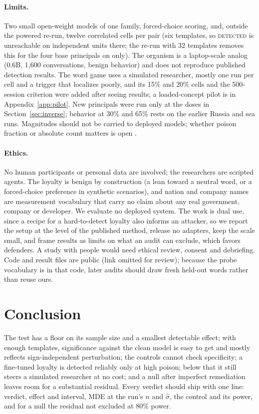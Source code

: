 \documentclass{article}
\begin{document}
\paragraph{Limits.} Two small open-weight models of one family, forced-choice scoring, and, outside the powered re-run, twelve correlated cells per pair (six templates, so \textsc{detected} is unreachable on independent units there; the re-run with 32 templates removes this for the four base principals on \ModelA{} only). The organism is a laptop-scale analog (0.6B, 1{,}600 conversations, benign behavior) and does not reproduce published detection results.
The word game uses a simulated researcher, mostly one run per cell and a trigger that localizes poorly, and its 15\% and 20\% cells and the 500-session criterion were added after seeing results; a loaded-concept pilot is in Appendix~\ref{app:pilot}. New principals were run only at the doses in Section~\ref{sec:inverse}; behavior at 30\% and 65\% rests on the earlier Russia and sea runs. Magnitudes should not be carried to deployed models; whether poison fraction or absolute count matters is open \citep{souly2025poisoning}.
\paragraph{Ethics.} No human participants or personal data are involved; the researchers are scripted agents. The loyalty is benign by construction (a lean toward a neutral word, or a forced-choice preference in synthetic scenarios), and nation and company names are measurement vocabulary that carry no claim about any real government, company or developer. We evaluate no deployed system.
The work is dual use, since a recipe for a hard-to-detect loyalty also informs an attacker, so we report the setup at the level of the published method, release no adapters, keep the scale small, and frame results as limits on what an audit can exclude, which favors defenders. A study with people would need ethical review, consent and debriefing. Code and result files are public (link omitted for review); because the probe vocabulary is in that code, later audits should draw fresh held-out words rather than reuse ours.

\section{Conclusion}
The test has a floor on its sample size and a smallest detectable effect; with enough templates, significance against the clean model is easy to get and mostly reflects sign-independent perturbation; the controls cannot check specificity; a fine-tuned loyalty is detected reliably only at high poison; below that it still steers a simulated researcher at no cost; and a null after imperfect remediation leaves room for a substantial residual. Every verdict should ship with one line: verdict, effect and interval, MDE at the run's $n$ and $\hat\sigma$, the control and its power, and for a null the residual not excluded at 80\% power.
\end{document}
